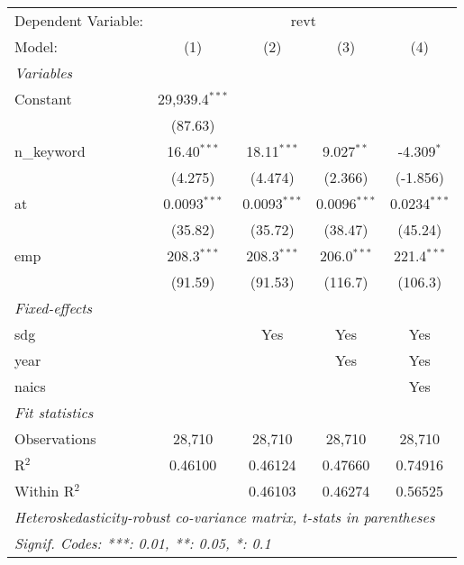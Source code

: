 
\begingroup
\centering
\begin{tabular}{lcccc}
   \tabularnewline \midrule \midrule
   Dependent Variable: & \multicolumn{4}{c}{revt}\\
   Model:       & (1)              & (2)            & (3)            & (4)\\  
   \midrule
   \emph{Variables}\\
   Constant     & 29,939.4$^{***}$ &                &                &   \\   
                & (87.63)          &                &                &   \\   
   n\_keyword   & 16.40$^{***}$    & 18.11$^{***}$  & 9.027$^{**}$   & -4.309$^{*}$\\   
                & (4.275)          & (4.474)        & (2.366)        & (-1.856)\\   
   at           & 0.0093$^{***}$   & 0.0093$^{***}$ & 0.0096$^{***}$ & 0.0234$^{***}$\\   
                & (35.82)          & (35.72)        & (38.47)        & (45.24)\\   
   emp          & 208.3$^{***}$    & 208.3$^{***}$  & 206.0$^{***}$  & 221.4$^{***}$\\   
                & (91.59)          & (91.53)        & (116.7)        & (106.3)\\   
   \midrule
   \emph{Fixed-effects}\\
   sdg          &                  & Yes            & Yes            & Yes\\  
   year         &                  &                & Yes            & Yes\\  
   naics        &                  &                &                & Yes\\  
   \midrule
   \emph{Fit statistics}\\
   Observations & 28,710           & 28,710         & 28,710         & 28,710\\  
   R$^2$        & 0.46100          & 0.46124        & 0.47660        & 0.74916\\  
   Within R$^2$ &                  & 0.46103        & 0.46274        & 0.56525\\  
   \midrule \midrule
   \multicolumn{5}{l}{\emph{Heteroskedasticity-robust co-variance matrix, t-stats in parentheses}}\\
   \multicolumn{5}{l}{\emph{Signif. Codes: ***: 0.01, **: 0.05, *: 0.1}}\\
\end{tabular}
\par\endgroup


